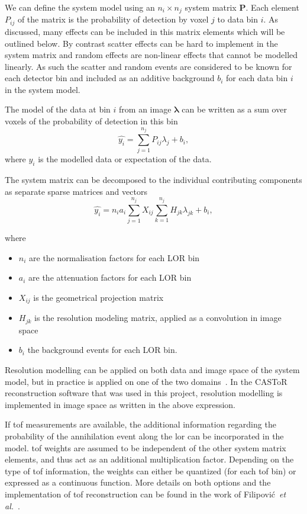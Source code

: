 We can define the system model using an $n_i \times n_j$ system matrix $\bm{P}$. Each element $P_{ij}$ of the matrix is the probability of detection by voxel $j$ to data bin $i$. 
As discussed, many effects can be included in this matrix elements which will be outlined below. By contrast scatter effects can be hard to implement in the system matrix and random effects are non-linear effects that cannot be modelled linearly. As such the scatter and random events are considered to be known for each detector bin and included as an additive background $b_i$ for each data bin $i$ in the system model.

The model of the data at bin $i$ from an image $\bm{\lambda}$ can be written as a sum over voxels of the probability of detection in this bin 
\begin{equation}
   \hat{y_i} = \sum_{j=1}^{n_j} P_{ij} \lambda_j + b_i ,
   \label{eqn:system_model}
\end{equation}
where $\hat{y_i}$ is the modelled data or expectation of the data.

The system matrix can be decomposed to the individual contributing components as separate sparse matrices and vectors
\begin{equation}
   \hat{y_i} = n_i a_i \sum_{j=1}^{n_j} X_{ij} \sum_{k=1}^{n_j} H_{jk} \lambda_{jk} + b_i ,
\end{equation}

where
\begin{itemize}
    \item $n_i$ are the normalisation factors for each LOR bin
    \item $a_i$ are the attenuation factors for each LOR bin
    \item $X_{ij}$ is the geometrical projection matrix
    \item $H_{jk}$ is the resolution modeling matrix, applied as a convolution in image space
    \item $b_i$ the background events for each LOR bin.
\end{itemize}
%
Resolution modelling can be applied on both data and image space of the system model, but in practice is applied on one of the two domains~\cite{Stute2013}. In the CASToR reconstruction software that was used in this project, resolution modelling is implemented in image space as written in the above expression.

If \gls{tof} measurements are available, the additional information regarding the probability of the annihilation event along the \gls{lor} can be incorporated in the model. \Gls{tof} weights are assumed to be independent of the other system matrix elements, and thus act as an additional multiplication factor. Depending on the type of \gls{tof} information, the weights can either be quantized (for each \gls{tof} bin) or expressed as a continuous function. More details on both options and the implementation of \gls{tof} reconstruction can be found in the work of Filipović~\textit{et al.}~\cite{Filipovic_2019}. 
%
